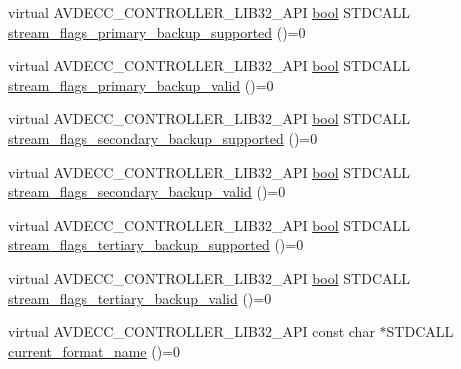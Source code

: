\begin{DoxyCompactItemize}
\item 
virtual A\+V\+D\+E\+C\+C\+\_\+\+C\+O\+N\+T\+R\+O\+L\+L\+E\+R\+\_\+\+L\+I\+B32\+\_\+\+A\+PI \hyperlink{avb__gptp_8h_af6a258d8f3ee5206d682d799316314b1}{bool} S\+T\+D\+C\+A\+LL \hyperlink{classavdecc__lib_1_1stream__output__descriptor__response_aea1a6dbe70cfe299a12bcb2a4ea73a38}{stream\+\_\+flags\+\_\+primary\+\_\+backup\+\_\+supported} ()=0
\item 
virtual A\+V\+D\+E\+C\+C\+\_\+\+C\+O\+N\+T\+R\+O\+L\+L\+E\+R\+\_\+\+L\+I\+B32\+\_\+\+A\+PI \hyperlink{avb__gptp_8h_af6a258d8f3ee5206d682d799316314b1}{bool} S\+T\+D\+C\+A\+LL \hyperlink{classavdecc__lib_1_1stream__output__descriptor__response_a35e1c2d08ac6d699e575f3ba118ef0f7}{stream\+\_\+flags\+\_\+primary\+\_\+backup\+\_\+valid} ()=0
\item 
virtual A\+V\+D\+E\+C\+C\+\_\+\+C\+O\+N\+T\+R\+O\+L\+L\+E\+R\+\_\+\+L\+I\+B32\+\_\+\+A\+PI \hyperlink{avb__gptp_8h_af6a258d8f3ee5206d682d799316314b1}{bool} S\+T\+D\+C\+A\+LL \hyperlink{classavdecc__lib_1_1stream__output__descriptor__response_acb3e666eaff1f1303ba9c2733aee3d52}{stream\+\_\+flags\+\_\+secondary\+\_\+backup\+\_\+supported} ()=0
\item 
virtual A\+V\+D\+E\+C\+C\+\_\+\+C\+O\+N\+T\+R\+O\+L\+L\+E\+R\+\_\+\+L\+I\+B32\+\_\+\+A\+PI \hyperlink{avb__gptp_8h_af6a258d8f3ee5206d682d799316314b1}{bool} S\+T\+D\+C\+A\+LL \hyperlink{classavdecc__lib_1_1stream__output__descriptor__response_a83765255f81d93d3bb28eeb9edec8904}{stream\+\_\+flags\+\_\+secondary\+\_\+backup\+\_\+valid} ()=0
\item 
virtual A\+V\+D\+E\+C\+C\+\_\+\+C\+O\+N\+T\+R\+O\+L\+L\+E\+R\+\_\+\+L\+I\+B32\+\_\+\+A\+PI \hyperlink{avb__gptp_8h_af6a258d8f3ee5206d682d799316314b1}{bool} S\+T\+D\+C\+A\+LL \hyperlink{classavdecc__lib_1_1stream__output__descriptor__response_abbd3928cc72f811f32fcb5a079f791b2}{stream\+\_\+flags\+\_\+tertiary\+\_\+backup\+\_\+supported} ()=0
\item 
virtual A\+V\+D\+E\+C\+C\+\_\+\+C\+O\+N\+T\+R\+O\+L\+L\+E\+R\+\_\+\+L\+I\+B32\+\_\+\+A\+PI \hyperlink{avb__gptp_8h_af6a258d8f3ee5206d682d799316314b1}{bool} S\+T\+D\+C\+A\+LL \hyperlink{classavdecc__lib_1_1stream__output__descriptor__response_a430a18cf3301728015f75d8a80676004}{stream\+\_\+flags\+\_\+tertiary\+\_\+backup\+\_\+valid} ()=0
\item 
virtual A\+V\+D\+E\+C\+C\+\_\+\+C\+O\+N\+T\+R\+O\+L\+L\+E\+R\+\_\+\+L\+I\+B32\+\_\+\+A\+PI const char $\ast$S\+T\+D\+C\+A\+LL \hyperlink{classavdecc__lib_1_1stream__output__descriptor__response_a24176b56bc0f1873b27d00565bc397c5}{current\+\_\+format\+\_\+name} ()=0

\end{DoxyCompactItemize}
